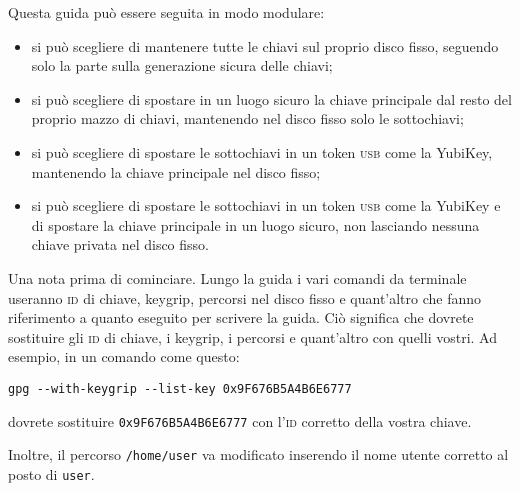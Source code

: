 \noindent Questa guida può essere seguita in modo modulare:

\begin{itemize}
  \item si può scegliere di mantenere tutte le chiavi sul proprio disco fisso,
  seguendo solo la parte sulla generazione sicura delle chiavi;
  \item si può scegliere di spostare in un luogo sicuro la chiave principale dal
  resto del proprio mazzo di chiavi, mantenendo nel disco fisso solo le
  sottochiavi;
  \item si può scegliere di spostare le sottochiavi in un token \textsc{usb}
  come la YubiKey, mantenendo la chiave principale nel disco fisso;
  \item si può scegliere di spostare le sottochiavi in un token \textsc{usb}
  come la YubiKey e di spostare la chiave principale in un luogo sicuro, non
  lasciando nessuna chiave privata nel disco fisso.
\end{itemize}\bigskip

\noindent Una nota prima di cominciare. Lungo la guida i vari comandi da
terminale useranno \textsc{id} di chiave, keygrip, percorsi nel disco fisso e
quant'altro che fanno riferimento a quanto eseguito per scrivere la guida. Ciò
significa che dovrete sostituire gli \textsc{id} di chiave, i keygrip, i
percorsi e quant'altro con quelli vostri. Ad esempio, in un comando come questo:

\begin{lstlisting}
gpg --with-keygrip --list-key 0x9F676B5A4B6E6777
\end{lstlisting}

\noindent dovrete sostituire \texttt{0x9F676B5A4B6E6777} con l'\textsc{id}
corretto della vostra chiave.

Inoltre, il percorso \texttt{/home/user} va modificato inserendo il nome utente
corretto al posto di \texttt{user}.

